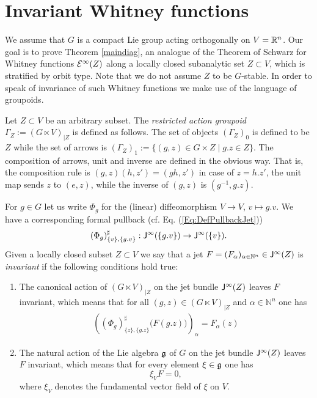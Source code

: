 %
%
\section{Invariant Whitney functions}
\label{invwhitney}
%
%

We assume that $G$ is a compact Lie group acting orthogonally on $V=\mathbb{R}^n$.
Our goal is to prove Theorem \ref{maindiag}, an analogue of the Theorem of Schwarz for 
Whitney functions $\mathcal{E}^\infty(Z)$ along a locally closed subanalytic set $Z\subset V$, which is stratified by orbit type. 
Note that we do not assume $Z$ to be $G$-stable. In order to speak of invariance of such Whitney functions we make use of 
the language of groupoids. 

\begin{definition} 
Let $Z\subset V$ be an arbitrary subset. The \emph{restricted action groupoid} $\Gamma_Z:=(G\ltimes V)_{|Z}$ is defined as follows. The set of objects $(\Gamma_Z)_0$ is defined to be $Z$ while the set 
of arrows is  $(\Gamma_Z)_1:=\{(g,z)\in G\times Z\mid g.z\in Z\}$. The composition of arrows, 
unit and inverse are defined in the obvious way. That is, the composition rule is 
$(g,z)(h,z')=(gh,z')$ in case of $z=h.z'$, the unit map sends $z$ to $(e,z)$, while the 
inverse of $(g,z)$ is $(g^{-1},g.z)$.
\end{definition}

For $g\in G$ let us write $\Phi_g$ for the (linear) diffeomorphism $V\to V$, $v\mapsto g.v$. 
We have a corresponding formal pullback (cf. Eq. (\ref{Eq:DefPullbackJet}))
\begin{eqnarray*}
(\Phi_g)^{\sharp}_{\{v\},\{g.v\}}:\mathsf{J}^\infty(\{g.v\})\to\mathsf{J}^\infty(\{v\}).
\end{eqnarray*}
Given a locally closed subset $Z\subset V$ we say that a jet $F=(F_{\alpha})_{\alpha\in\mathbb N^n}\in \mathsf{J}^\infty(Z)$ is 
\emph{invariant} if the following conditions hold true:
\begin{enumerate}[{(Inv}1)]
\item \label{Ite:Action}
  The canonical action of $(G\ltimes V)_{|Z}$ on the jet bundle $\mathsf{J}^\infty(Z)$
  leaves $F$ invariant, which means that
  for all $(g,z)\in(G\ltimes V)_{|Z}$ and  $\alpha\in \mathbb N^n$ one has 
  \begin{eqnarray*}
     \left((\Phi_g)^{\sharp}_{\{z\},\{g.z\}}\big(F (g.z) \big)\right)_\alpha=F_{\alpha}(z)
  \end{eqnarray*}
\item\label{Ite:Constant}
     The natural action of the Lie algebra $\mathfrak{g}$ of $G$ on the jet bundle $\mathsf{J}^\infty(Z)$
     leaves $F$ invariant, which means that for every element $\xi \in \mathfrak{g}$ one has 
     \[
       \xi_V  F =0,
     \]
    where $\xi_V$ denotes the fundamental vector field of $\xi$ on $V$.
\end{enumerate}

